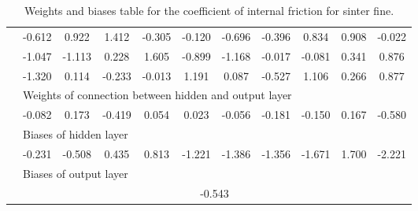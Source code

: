 \begin{table}[htbp]
\begin{tabular}{l|cccccccccc}
  & -0.612 &  0.922 &  1.412 &  -0.305 &  -0.120 &  -0.696 &  -0.396 &  0.834 &  0.908 &  -0.022 \\ 
  & -1.047 &  -1.113 &  0.228 &  1.605 &  -0.899 &  -1.168 &  -0.017 &  -0.081 &  0.341 &  0.876 \\ 
  & -1.320 &  0.114 &  -0.233 &  -0.013 &  1.191 &  0.087 &  -0.527 &  1.106 &  0.266 &  0.877 \\ 
\hline 
   &    \multicolumn{10}{l}{Weights of connection between hidden and output layer}  \\ 
  & -0.082 &  0.173 &  -0.419 &  0.054 &  0.023 &  -0.056 &  -0.181 &  -0.150 &  0.167 &  -0.580 \\ 
\hline 
   &    \multicolumn{10}{l}{Biases of hidden layer}  \\ 
  & -0.231 &  -0.508 &  0.435 &  0.813 &  -1.221 &  -1.386 &  -1.356 &  -1.671 &  1.700 &  -2.221 \\ 
\hline 
\hline 
   &    \multicolumn{10}{l}{Biases of output layer}  \\ 
 &    \multicolumn{10}{c}{-0.543}  \\ 
\hline 
 \end{tabular} 
\caption[Weights and biases table for the coefficient of internal friction
for sinter fine]{Weights and biases table for the coefficient of internal
friction for sinter fine.}
\label{tab:34weightsoriginalsinterfinesct} 
\end{table}